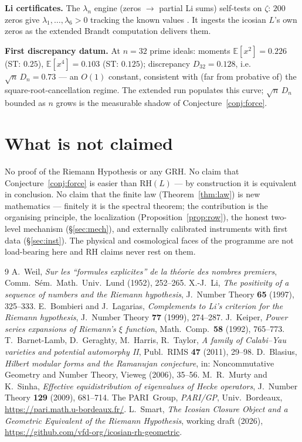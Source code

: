 \documentclass[11pt]{article}
\theoremstyle{remark}
\newcommand{\RH}{\mathrm{RH}}
\begin{document}
\textbf{Li certificates.} The $\lambda_n$ engine (zeros $\to$ partial Li sums)
self-tests on $\zeta$: $200$ zeros give $\lambda_1,\dots,\lambda_6 > 0$ tracking the
known values \cite{Keiper92,Li97}. It ingests the icosian $L$'s own zeros as the
extended Brandt computation delivers them.

\textbf{First discrepancy datum.} At $n=32$ prime ideals: moments
$\mathbb{E}[x^2]=0.226$ (ST: $0.25$), $\mathbb{E}[x^4]=0.103$ (ST: $0.125$);
discrepancy $D_{32}=0.128$, i.e.\ $\sqrt{n}\,D_n = 0.73$ --- an $O(1)$ constant,
consistent with (far from probative of) the square-root-cancellation regime. The
extended run populates this curve; $\sqrt{n}\,D_n$ bounded as $n$ grows is the
measurable shadow of Conjecture~\ref{conj:force}.

\section{What is not claimed}\label{sec:not}

No proof of the Riemann Hypothesis or any GRH. No claim that
Conjecture~\ref{conj:force} is easier than $\RH(L)$ --- by construction it is
equivalent in conclusion. No claim that the finite law (Theorem~\ref{thm:law}) is
new mathematics --- finitely it is the spectral theorem; the contribution is the
organising principle, the localization (Proposition~\ref{prop:row}), the honest
two-level mechanism (\S\ref{sec:mech}), and externally calibrated instruments with
first data (\S\ref{sec:inst}). The physical and cosmological faces of the programme
are not load-bearing here and $\RH$ claims never rest on them.

\begin{thebibliography}{9}\small
{} A.~Weil, \emph{Sur les ``formules explicites'' de la th\'eorie des
nombres premiers}, Comm.\ S\'em.\ Math.\ Univ.\ Lund (1952), 252--265.
 X.-J.~Li, \emph{The positivity of a sequence of numbers and the
Riemann hypothesis}, J.~Number Theory \textbf{65} (1997), 325--333.
 E.~Bombieri and J.~Lagarias, \emph{Complements to Li's criterion for
the Riemann hypothesis}, J.~Number Theory \textbf{77} (1999), 274--287.
 J.~Keiper, \emph{Power series expansions of Riemann's $\xi$
function}, Math.\ Comp.\ \textbf{58} (1992), 765--773.
 T.~Barnet-Lamb, D.~Geraghty, M.~Harris, R.~Taylor, \emph{A family of
Calabi--Yau varieties and potential automorphy II}, Publ.\ RIMS \textbf{47} (2011),
29--98.
 D.~Blasius, \emph{Hilbert modular forms and the Ramanujan
conjecture}, in: Noncommutative Geometry and Number Theory, Vieweg (2006), 35--56.
 M.~R.~Murty and K.~Sinha, \emph{Effective equidistribution of
eigenvalues of Hecke operators}, J.~Number Theory \textbf{129} (2009), 681--714.
 The PARI~Group, \emph{PARI/GP}, Univ.\ Bordeaux,
\url{https://pari.math.u-bordeaux.fr/}.
 L.~Smart, \emph{The Icosian Closure Object and a Geometric
Equivalent of the Riemann Hypothesis}, working draft (2026),
\url{https://github.com/vfd-org/icosian-rh-geometric}.
\end{thebibliography}
\end{document}
